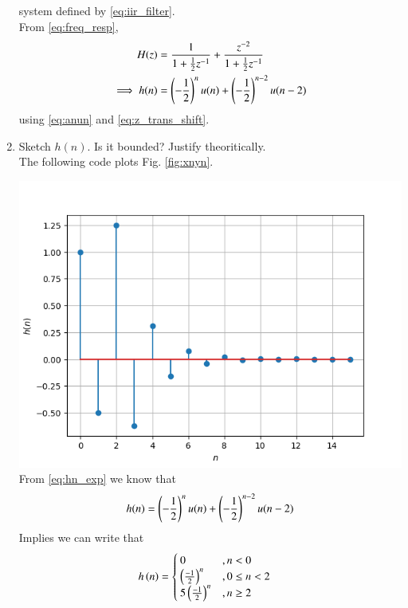\documentclass[journal,12pt,twocolumn]{IEEEtran}
\renewcommand\thesection{\arabic{section}}
\begin{document}
\begin{enumerate}[label=\thesection.\arabic*]
system defined by \eqref{eq:iir_filter}.
\\
\solution From \eqref{eq:freq_resp},
\begin{align}
H(z) &= \frac{1}{1 + \frac{1}{2}z^{-1}} + \frac{ z^{-2}}{1 + \frac{1}{2}z^{-1}}
\\
\implies h(n) &= \left(-\frac{1}{2}\right)^{n}u(n) + \left(-\frac{1}{2}\right)^{n-2}u(n-2)
\end{align}
using \eqref{eq:anun} and \eqref{eq:z_trans_shift}.
\item Sketch $h(n)$. Is it bounded? Justify theoritically.
\\
\solution The following code plots Fig. \ref{fig:xnyn}.

\includegraphics[width=\columnwidth]{figures/Figure_5_3.png}
From \eqref{eq:hn_exp} we know that\\
\begin{equation}
	h(n) = \left(-\frac{1}{2}\right)^{n}u(n) + \left(-\frac{1}{2}\right)^{n-2}u(n-2)
\end{equation}
Implies we can write that\\
\begin{align}
	h\left(n\right) &= \begin{cases}
					 0 &, n < 0\\
					 \left(\frac{-1}{2}\right)^n &, 0\leq n<2\\
					 5\left(\frac{-1}{2}\right)^n &, n \geq 2

\end{cases}
\end{align}
\end{enumerate}
\end{document}
